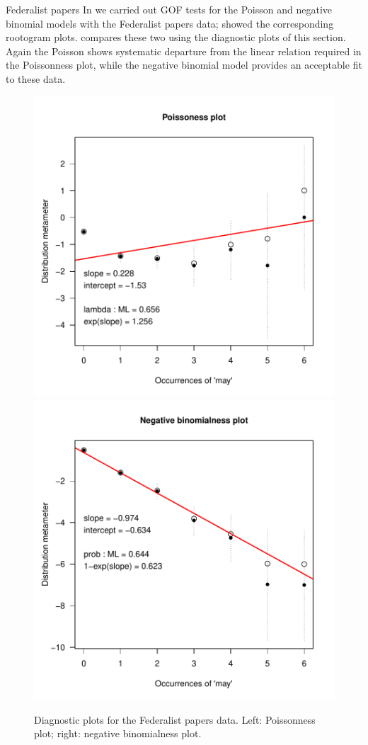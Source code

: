 \documentclass[11pt]{book}
\renewenvironment{knitrout}{\small\renewcommand{\baselinestretch}{.85}}{} %
\begin{document}
\begin{Example}{Federalist papers}
In  we carried out GOF tests for the Poisson and
negative binomial models with the Federalist papers data;
 showed the corresponding rootogram plots.
 compares these two using the diagnostic plots of
this section. Again the Poisson shows systematic departure from the 
linear relation required in the Poissonness plot, while the
negative binomial model provides an acceptable fit to
these data.
\begin{knitrout}
\color{fgcolor}\begin{kframe}
\begin{alltt}
  \hlstd{=} \hlstd{,} \hlstd{=}\hlstd{)}
  \hlstd{=} \hlstd{,} \hlstd{=}\hlstd{)}
\end{alltt}
\end{kframe}\begin{figure}[!htbp]


\centerline{\includegraphics[width=.49\textwidth]{ch03/fig/distplot51} 
\includegraphics[width=.49\textwidth]{ch03/fig/distplot52} }

\caption[Diagnostic plots for the Federalist papers data]{Diagnostic plots for the Federalist papers data. Left: Poissonness plot; right: negative binomialness plot.\label{fig:distplot5}}
\end{figure}


\end{knitrout}
\end{Example}
\end{document}
